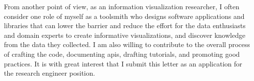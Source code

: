 \documentclass[11pt,a4paper,sans]{moderncv} %
\begin{document}
From another point of view, as an information visualization researcher, I often consider one role of myself as a toolsmith who designs software applications and libraries that can lower the barrier and reduce the effort for the data enthusiasts and domain experts to create informative visualizations, and discover knowledge from the data they collected. I am also willing to contribute to the overall process of crafting the code, documenting apis, drafting tutorials, and promoting good practices. It is with great interest that I submit this letter as an application for the research engineer position.


\vspace{1.0cm}


\makeletterclosing %
\end{document}
